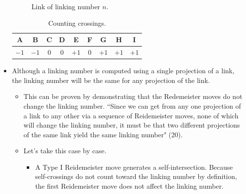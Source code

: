 \documentclass[titlepage]{article}
\numberwithin{figure}{section}
\numberwithin{table}{section}
\numberwithin{equation}{section}
\newcommand{\dq}[2]{``#1" (#2).}
\begin{document}
\begin{itemize}
\begin{figure}[h!]
        \caption{Link of linking number $n$.}
        \label{fig:ex1-15}
    \end{figure}
    \renewcommand{\arraystretch}{1.4}
    \begin{table}[h!]
        \centering
        \begin{tabular}{|c|c|c|c|c|c|c|c|c|}
            \hline
            A    & B    & C   & D   & E    & F   & G    & H    & I   \\
            \hline
            $-1$ & $-1$ & $0$ & $0$ & $+1$ & $0$ & $+1$ & $+1$ & $+1$\\
            \hline
        \end{tabular}
        \caption{Counting crossings.}
        \label{tab:ex1-15}
    \end{table}
    \item Although a linking number is computed using a single projection of a link, the linking number will be the same for any projection of the link.
    \begin{itemize}
        \item This can be proven by demonstrating that the Redemeister moves do not change the linking number. \dq{Since we can get from any one projection of a link to any other via a sequence of Reidemeister moves, none of which will change the linking number, it must be that two different projections of the same link yield the same linking number}{20}
        \item Let's take this case by case.
        \begin{itemize}
            \item A Type I Reidemeister move generates a self-intersection. Because self-crossings do not count toward the linking number by definition, the first Reidemeister move does not affect the linking number.

\end{itemize}
\end{itemize}
\end{itemize}
\end{document}
